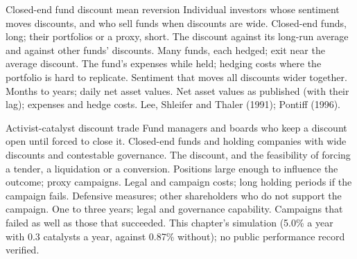 \begin{strategyfile}{Closed-end fund discount mean reversion}\label{strat:s1:share-classes-holding-companies-closed-end-funds-spacs:cef}
 Individual investors whose sentiment moves discounts, and who sell funds when discounts are wide.
 Closed-end funds, long; their portfolios or a proxy, short.
 The discount against its long-run average and against other funds' discounts.
 Many funds, each hedged; exit near the average discount.
 The fund's expenses while held; hedging costs where the portfolio is hard to replicate.
 Sentiment that moves all discounts wider together.
 Months to years; daily net asset values.
 Net asset values as published (with their lag); expenses and hedge costs.
 Lee, Shleifer and Thaler (1991); Pontiff (1996).
\end{strategyfile}

\begin{strategyfile}{Activist-catalyst discount trade}\label{strat:s1:share-classes-holding-companies-closed-end-funds-spacs:activist}
 Fund managers and boards who keep a discount open until forced to close it.
 Closed-end funds and holding companies with wide discounts and contestable governance.
 The discount, and the feasibility of forcing a tender, a liquidation or a conversion.
 Positions large enough to influence the outcome; proxy campaigns.
 Legal and campaign costs; long holding periods if the campaign fails.
 Defensive measures; other shareholders who do not support the campaign.
 One to three years; legal and governance capability.
 Campaigns that failed as well as those that succeeded.
 This chapter's simulation (5.0\% a year with 0.3 catalysts a year, against 0.87\% without); no public performance record verified.
\end{strategyfile}


